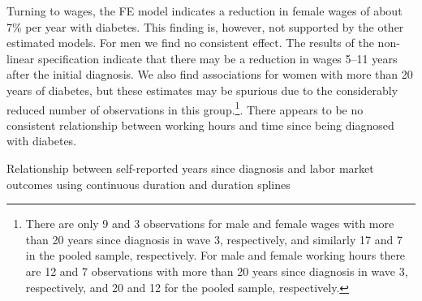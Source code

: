 \documentclass[12pt,english]{article}
\begin{document}
{Turning to wages, the \ac{FE} model indicates a reduction in female wages of about 7\% per year with diabetes. This finding is, however, not supported by the other estimated models. For men we find no consistent effect. The results of the non-linear specification indicate that there may be a reduction in wages 5--11 years after the initial diagnosis. We also find associations for women with more than 20 years of diabetes, but these estimates may be spurious due to the considerably reduced number of observations in this group.\footnote{There are only 9 and 3 observations for male and female wages with more than 20 years since diagnosis in wave 3, respectively, and similarly 17 and 7 in the pooled sample, respectively. For male and female working hours there are 12 and 7 observations with more than 20 years since diagnosis in wave 3, respectively, and 20 and 12 for the pooled sample, respectively.}. There appears to be no consistent relationship between working hours and time since being diagnosed with diabetes.
\begin{table}[h]
\caption{\label{tab:Self-reported-diabetes-duration}Relationship between self-reported years since diagnosis and labor market outcomes using continuous duration and duration splines}
\begin{center}
\begin{adjustbox}{max width=\textwidth}


\end{adjustbox}
\end{center}
\end{table}}
\end{document}
